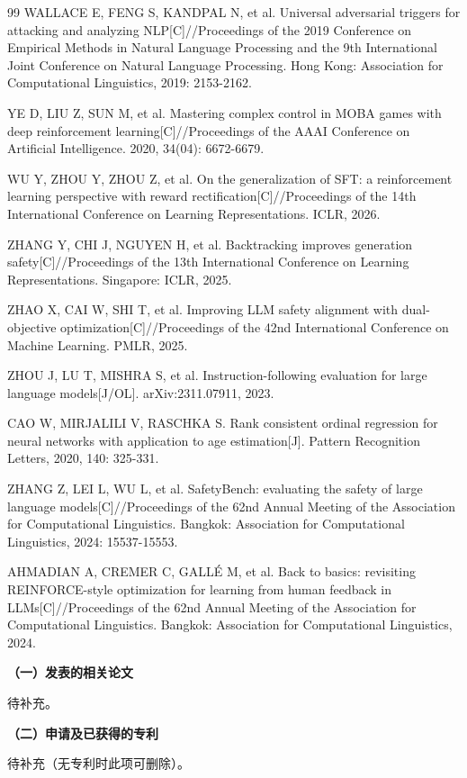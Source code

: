\documentclass[fontset=fandol,type=master,campus=shenzhen,etitleauto=true]{hithesisbook}
\begin{document}
\begin{thebibliography}{99}
 WALLACE E, FENG S, KANDPAL N, et al. Universal adversarial triggers for attacking and analyzing NLP[C]//Proceedings of the 2019 Conference on Empirical Methods in Natural Language Processing and the 9th International Joint Conference on Natural Language Processing. Hong Kong: Association for Computational Linguistics, 2019: 2153-2162.

 YE D, LIU Z, SUN M, et al. Mastering complex control in MOBA games with deep reinforcement learning[C]//Proceedings of the AAAI Conference on Artificial Intelligence. 2020, 34(04): 6672-6679.

 WU Y, ZHOU Y, ZHOU Z, et al. On the generalization of SFT: a reinforcement learning perspective with reward rectification[C]//Proceedings of the 14th International Conference on Learning Representations. ICLR, 2026.

 ZHANG Y, CHI J, NGUYEN H, et al. Backtracking improves generation safety[C]//Proceedings of the 13th International Conference on Learning Representations. Singapore: ICLR, 2025.

 ZHAO X, CAI W, SHI T, et al. Improving LLM safety alignment with dual-objective optimization[C]//Proceedings of the 42nd International Conference on Machine Learning. PMLR, 2025.

 ZHOU J, LU T, MISHRA S, et al. Instruction-following evaluation for large language models[J/OL]. arXiv:2311.07911, 2023.

 CAO W, MIRJALILI V, RASCHKA S. Rank consistent ordinal regression for neural networks with application to age estimation[J]. Pattern Recognition Letters, 2020, 140: 325-331.

 ZHANG Z, LEI L, WU L, et al. SafetyBench: evaluating the safety of large language models[C]//Proceedings of the 62nd Annual Meeting of the Association for Computational Linguistics. Bangkok: Association for Computational Linguistics, 2024: 15537-15553.

 AHMADIAN A, CREMER C, GALL\'E M, et al. Back to basics: revisiting REINFORCE-style optimization for learning from human feedback in LLMs[C]//Proceedings of the 62nd Annual Meeting of the Association for Computational Linguistics. Bangkok: Association for Computational Linguistics, 2024.

\end{thebibliography}

\begin{publication}
\noindent\textbf{（一）发表的相关论文}
\begin{publist}
\item 待补充。
\end{publist}

\noindent\textbf{（二）申请及已获得的专利}
\begin{publist}
\item 待补充（无专利时此项可删除）。
\end{publist}
\end{publication}
\end{document}
